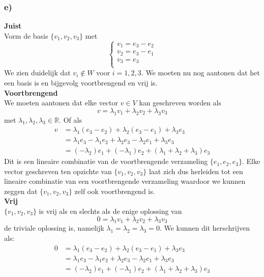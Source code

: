 \documentclass[lineaire_algebra_oplossingen.tex]{subfiles}
\begin{document}
\subsubsection*{e)}
\textbf{Juist}\\
Vorm de basis $\{v_1,v_2,v_3\}$ met
\begin{equation*}
\begin{cases}
v_1 = e_3 - e_2\\
v_2  = e_3 - e_1\\
v_3 = e_3\\
\end{cases}
\end{equation*}
We zien duidelijk dat $v_i \notin W$ voor $i=1,2,3$.
We moeten nu nog aantonen dat het een basis is en bijgevolg voortbrengend en vrij is.\\
\newline
\textbf{Voortbrengend}\\
We moeten aantonen dat elke vector $v \in V$ kan geschreven worden als
$$ v = \lambda_1 v_1 + \lambda_2  v_2 + \lambda_3  v_3$$ met $\lambda_1,\lambda_2,\lambda_3 \in \mathbb{R}$. Of als
\begin{align*}
v &= \lambda_1 (e_3 - e_2) + \lambda_2  (e_3 - e_1) + \lambda_3 e_3\\
&= \lambda_1 e_3 - \lambda_1 e_2 + \lambda_2 e_3 - \lambda_2 e_1 + \lambda_3 e_3\\
&= (-\lambda_2) e_1+ (- \lambda_1) e_2+ (\lambda_1 + \lambda_2 + \lambda_3)e_3
\end{align*}
Dit is een lineaire combinatie van de voortbrengende verzameling $\{e_1,e_2,e_3\}$. Elke vector geschreven ten opzichte van $\{v_1,v_2,v_3\}$ laat zich dus herleiden tot een lineaire combinatie van een voortbrengende verzameling waardoor we kunnen zeggen dat $\{v_1,v_2,v_3\}$ zelf ook voortbrengend is.\\
\newline
\textbf{Vrij}\\
$\{v_1,v_2,v_3\}$ is vrij als en slechts als de enige oplossing van
$$ 0 = \lambda_1 v_1 + \lambda_2  v_2 + \lambda_3  v_3$$
de triviale oplossing is, namelijk $\lambda_1 = \lambda_2 = \lambda_3 = 0$.
We kunnen dit herschrijven als:
\begin{align*}
0 &= \lambda_1 (e_3 - e_2) + \lambda_2  (e_3 - e_1) + \lambda_3 e_3\\
&= \lambda_1 e_3 - \lambda_1 e_2 + \lambda_2 e_3 - \lambda_2 e_1 + \lambda_3 e_3\\
&= (-\lambda_2) e_1+ (- \lambda_1) e_2+ (\lambda_1 + \lambda_2 + \lambda_3)e_3
\end{align*}
\end{document}
